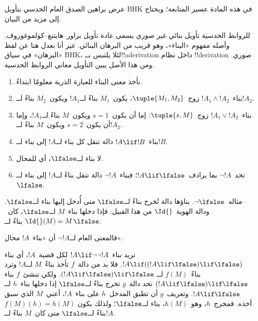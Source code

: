 \documentclass[../../../include/open-logic-section]{subfiles}
\begin{document}


\begin{editorial}
  عرض براهين الصدق العام الحدسي بتأويل BHK في هذه المادة عسير المتابعة؛
  ويحتاج إلى مزيد من البيان.
\end{editorial}

للروابط الحدسية تأويل بنائي غير صوري يسمى عادة تأويل
براور--هايتنغ--كولموغوروف. وأصله مفهوم «البناء»، وهو قريب من البرهان
البنائي. غير أنا نعدل هنا عن لفظ «البرهان» في سياق BHK، لئلا يلتبس
بــ!!a{derivation} داخل نظام !!{derivation} صوري. ومن هذا الأصل يبين
التأويل معاني الروابط الحدسية.

\begin{enumerate}
\item نأخذ معنى البناء للعبارة الذرية معلومًا ابتداءً.
\item بناء~$!A_1 \land !A_2$ زوج~$\tuple{M_1, M_2}$، يكون~$M_1$
  بناءً لــ$!A_1$ ويكون~$M_2$ بناءً لــ$!A_2$.
\item بناء~$!A_1 \lor !A_2$ زوج~$\tuple{s, M}$: إما أن يكون~$s=1$
  ويكون~$M$ بناءً لــ$!A_1$، وإما أن يكون~$s=2$ ويكون~$M$ بناءً لــ$!A_2$.
\item بناء~$!A \lif !B$ دالة تنقل كل بناء لــ$!A$ إلى بناء لــ$!B$.
\item لا بناء لــ$\lfalse$، أي للمحال.
\item تحد~$\lnot !A$ بما يرادف~$!A \lif \lfalse$؛ فبناء~$\lnot !A$
  دالة تنقل بناءً لــ$!A$ إلى بناء لــ$\lfalse$.
\end{enumerate}

\begin{ex}
مثاله~$\lnot \lfalse$. بناؤها دالة تُخرج بناءً لــ$\lfalse$ متى أُدخل
إليها بناء لــ$\lfalse$. ودالة الهوية~$\Id{}$ من هذا القبيل: فإذا دخلها
بناء~$M$ لــ$\lfalse$، كان~$\Id{}(M) = M$ بناءً لــ$\lfalse$.
\end{ex}

فالمعنى العام لــ$\lnot !A$ أن «بناء~$!A$ محال».

\begin{ex}
نريد بناء~$!A \lif \lnot \lnot !A$ لكل قضية~$!A$، أي بناء
$!A \lif ((!A \lif \lfalse) \lif \lfalse)$. فلا بد من دالة~$f$ تأخذ
بناءً~$M$ لــ$!A$ وترد بناءً~$f(M)$ لــ
$(!A \lif \lfalse) \lif \lfalse$. ولكي تنشئ~$f$ بناء
$(!A \lif \lfalse) \lif \lfalse$ نحد دالة~$g$
تخرج بناءً لــ$\lfalse$ إذا دخلها بناء~$h$ لــ$!A \lif \lfalse$.
وتعريف~$g$ أن تطبق المدخل~$h$ على بناء~$!A$، أعني~$M$ الذي سبق أخذه.
فمخرج~$h$، وهو~$h(M)$، بناء لــ$\lfalse$؛ ولذلك يكون
$f(M)(h) = h(M)$ بناءً لــ$\lfalse$ متى كان~$M$ بناءً لــ$!A$.
\end{ex}
\end{document}
